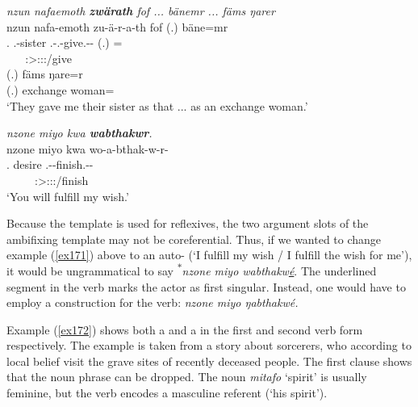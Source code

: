 \begin{exe}
	\ex \emph{nzun nafaemoth \textbf{zwärath} fof ... bänemr ... fäms ŋarer}\\
	\glll nzun nafa-emoth zu-ä-r-a-th fof (.) bäne=mr\\
	\Fsg.\Dat{} \Third.\Poss-sister \Fsg.\Gam-\Vc.\Ndu-give.\Rs-\Pst-\Stnsg{} \Emph{} (.) \Recog=\Purp{}\\
	~ ~ {\Stpl:\Sbj>\Fsg:\Io:\Pst:\Pfv/give} ~ ~ ~ ~ ~\\
	\sn
	\gll (.) fäms ŋare=r\\
	(.) exchange woman=\Purp\\
	\trans `They gave me their sister as that ... as an exchange woman.'\\ 
	\label{ex173}
\end{exe}
\begin{exe}
	\ex \emph{nzone miyo kwa \textbf{wabthakwr}.}\\
	\glll nzone miyo kwa wo-a-bthak-w-r-\Zero{}\\
	\Fsg.\Poss{} desire \Fut{} \Fsg.\Alph-\Vc-finish.\Ext-\Lk-\Stsg{}\\
	~ ~ ~ {\Stsg:\Sbj>\Fsg:\Io:\Nonpast:\Ipfv/finish}\\
	\trans `You will fulfill my wish.' 
	\label{ex171}
\end{exe}

Because the  template is used for reflexives, the two argument slots of the ambifixing template may not be coreferential. Thus, if we wanted to change example (\ref{ex171}) above to an auto- (`I fulfill my wish / I fulfill the wish for me'), it would be ungrammatical to say \textsuperscript{$\ast$}\emph{nzone miyo wabthakw\uline{é}}. The underlined segment in the verb marks the actor as first singular. Instead, one would have to employ a  construction for the verb: \emph{nzone miyo ŋabthakwé.}%

Example (\ref{ex172}) shows both a  and a  in the first and second verb form respectively. The example is taken from a story about sorcerers, who \textendash{} according to local belief \textendash{} visit the grave sites of recently deceased people. The first clause shows that the  noun phrase can be dropped. The noun \emph{mitafo} `spirit' is usually feminine, but the verb encodes a masculine referent (`his spirit').

